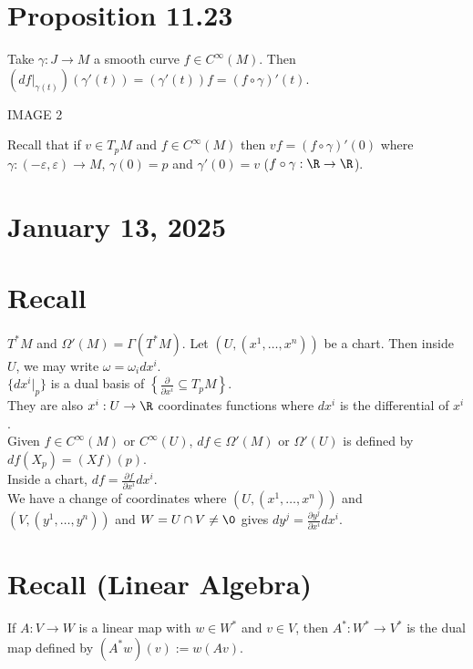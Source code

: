 \documentclass[11pt]{article}
\begin{document}
\section*{Proposition 11.23}
\label{sec:org4ab60e7}
Take \(\gamma:J\to M\) a smooth curve \(f\in C^{\infty}(M)\). Then \((df|_{\gamma(t)})(\gamma'(t))=(\gamma'(t))f=(f\circ\gamma)'(t)\).\\
\begin{center}
IMAGE 2\\
\end{center}
Recall that if \(v\in T_{p}M\) and \(f\in C^{\infty}(M)\) then \(vf=(f\circ\gamma)'(0)\) where \(\gamma:(-\varepsilon,\varepsilon)\to M\), \(\gamma(0)=p\) and \(\gamma'(0)=v\) (\(f\circ\gamma:\R\to\R\)).\\
\section*{January 13, 2025}
\label{sec:orgcd07cd0}
\section*{Recall}
\label{sec:org9752fa2}
\(T^{*}M\) and \(\Omega'(M)=\Gamma(T^{*}M)\). Let \((U,(x^{1},\ldots,x^{n}))\) be a chart. Then inside \(U\), we may write \(\omega=\omega_{i}dx^{i}\).\\
\(\{dx^{i}|_{p}\}\) is a dual basis of \(\left\{ \frac{\partial}{\partial x^{i}}\subseteq T_{p}M \right\}\).\\
They are also \(x^{i}:U\to\R\) coordinates functions where \(dx^{i}\) is the differential of \(x^{i}\).\\
Given \(f\in C^{\infty}(M)\) or \(C^{\infty}(U)\), \(df\in\Omega'(M)\) or \(\Omega'(U)\) is defined by \(df(X_{p})=(Xf)(p)\).\\
Inside a chart, \(df=\frac{\partial f}{\partial x^{i}}dx^{i}\).\\
We have a change of coordinates where \((U,(x^{1},\dots,x^{n}))\) and \((V,(y^{1},\ldots,y^{n}))\) and \(W=U\cap V\neq\0\) gives \(dy^{j}=\frac{\partial y^{j}}{\partial x^{i}}dx^{i}\).\\
\section*{Recall (Linear Algebra)}
\label{sec:org691d1c0}
If \(A:V\to W\) is a linear map with \(w\in W^{*}\) and \(v\in V\), then \(A^{*}:W^{*}\to V^{*}\) is the dual map defined by \((A^{*}w)(v):=w(Av)\).\\
\end{document}
